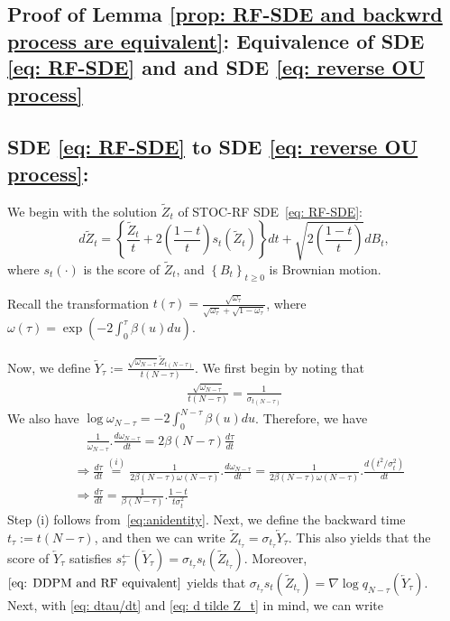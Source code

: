 \documentclass{article}
\theoremstyle{plain}
\theoremstyle{definition}
\theoremstyle{remark}
\newcommand{\bc}[1]{\left\{{#1}\right\}}
\newcommand{\br}[1]{\left({#1}\right)}
\begin{document}
\subsection{Proof of Lemma \ref{prop: RF-SDE and backwrd process are equivalent}: Equivalence of SDE \eqref{eq: RF-SDE} and and SDE \eqref{eq: reverse OU process}}
\label{app: equivalence of backward and stoc-RF}

\subsection*{SDE \eqref{eq: RF-SDE} to SDE \eqref{eq: reverse OU process}:}
We begin with the solution $\tilde Z_t$ of STOC-RF SDE~\eqref{eq: RF-SDE}:
\begin{equation}
\label{eq: d tilde Z_t}
d \tilde Z_t = \bc{\frac{\tilde Z_t}{t} + 2 \br{\frac{1-t}{t}} s_t(\tilde Z_t)}dt + \sqrt{2 \br{\frac{1-t}{t}}} d B_t,
\end{equation}
where $s_t(\cdot)$ is the score of $\tilde Z_t$, and $\bc{B_t}_{t \ge 0}$ is Brownian motion.

Recall the transformation $t(\tau) = \frac{\sqrt{\omega_{\tau}}}{\sqrt{\omega_\tau} + \sqrt{1 - \omega_\tau}}$, where $\omega(\tau)  = \exp \br{- 2 \int_{0}^\tau \beta(u) du}$. 

Now, we define $\overleftarrow Y_\tau:= \frac{\sqrt{\omega_{N-\tau}} \tilde Z_{t(N-\tau)}}{t(N - \tau)}$. We first begin by noting that 
\begin{align}\label{eq:anidentity}
\frac{\sqrt{\omega_{N-\tau}}}{t(N- \tau)} = \frac{1}{ \sigma_{t(N - \tau)}}
\end{align}
We also have $\log \omega_{N- \tau} = - 2 \int_{0}^{N - \tau} \beta(u) du$. Therefore, we have 
\begin{equation}
\label{eq: dtau/dt}
    \begin{aligned}
        &\quad  \frac{1}{\omega_{N - \tau}}. \frac{d \omega_{N-\tau}}{dt} = 2 \beta(N- \tau) \frac{d \tau}{dt}\\
        & \Rightarrow \frac{d \tau}{dt} \stackrel{(i)}{=} \frac{1}{2 \beta(N - \tau) \omega(N - \tau)} . \frac{d\omega_{N - \tau}}{dt} = \frac{1}{2 \beta(N - \tau) \omega(N - \tau)} . \frac{d(t^2/\sigma_t^2)}{dt}\\
        & \Rightarrow \frac{d \tau}{d t } = \frac{1}{\beta(N - \tau)}. \frac{1 - t}{t \sigma_t^2}
    \end{aligned}
\end{equation}
Step (i) follows from~\eqref{eq:anidentity}.
Next, we define the backward time $t_\tau:= t(N- \tau)$, and then we can write $\tilde Z_{t_\tau} = \sigma_{t_\tau} \overleftarrow Y_\tau$. This also yields that the score of $\overleftarrow Y_\tau$ satisfies $s^{\leftarrow}_\tau(\overleftarrow Y_\tau) = \sigma_{t_\tau} s_t(\tilde Z_{t_\tau})$. Moreover, $\eqref{eq: DDPM and RF equivalent}$ yields that $\sigma_{t_\tau} s_t(\tilde Z_{t_\tau}) = \nabla \log q_{N - \tau}(\overleftarrow Y_\tau)$.
Next, with \eqref{eq: dtau/dt} and \eqref{eq: d tilde Z_t} in mind, we can write 
\end{document}
